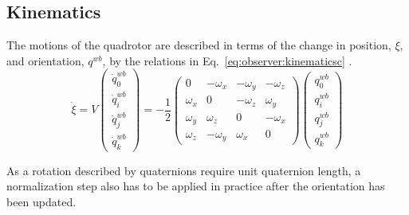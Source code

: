     \subsection{Kinematics}
        The motions of the quadrotor are described in terms of the change in position, $\xi$,
        and orientation, $q^{wb}$, by the relations in Eq.~\eqref{eq:observer:kinematicsc} \citep{Pounds_modellingand}. %
        \begin{subequations}
            \label{eq:observer:kinematicsc}
            \begin{equation}
                \label{eq:observer:position}
                \dot{\xi} = V
            \end{equation}
            \begin{equation}
                \label{eq:observer:quaternionsc}
                \left(\begin{array}{c}
                    \dot{q}^{wb}_{0} \\
                    \dot{q}^{wb}_{i} \\
                    \dot{q}^{wb}_{j} \\
                    \dot{q}^{wb}_{k}
                \end{array}\right) = -\frac{1}{2}\left(\begin{array}{cccc}
                0 & -\omega_{x} & -\omega_{y} & -\omega_{z} \\
                \omega_{x} & 0 & -\omega_{z} & \omega_{y} \\
                \omega_{y} & \omega_{z} & 0 & -\omega_{x} \\
                \omega_{z} & -\omega_{y} & \omega_{x} & 0
                \end{array}\right)\left(\begin{array}{c}
                q^{wb}_{0} \\
                q^{wb}_{i} \\
                q^{wb}_{j} \\
                q^{wb}_{k}
                \end{array}\right)
            \end{equation}
        \end{subequations}

        As a rotation described by quaternions require unit quaternion length,
        a normalization step also has to be applied in practice after the
        orientation has been updated.


